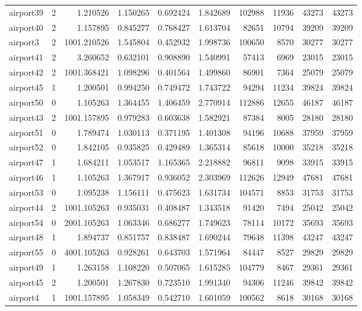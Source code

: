 \begin{longtable}{|l|r|r|r|r|r|r|r|r|r|}
airport39 & 2 & 1.210526 & 1.150265 & 0.692424 & 1.842689 & 102988 & 11936 & 43273 & 43273 \\
airport40 & 2 & 1.157895 & 0.845277 & 0.768427 & 1.613704 & 82651 & 10794 & 39209 & 39209 \\
airport3 & 2 & 1001.210526 & 1.545804 & 0.452932 & 1.998736 & 100650 & 8570 & 30277 & 30277 \\
airport41 & 2 & 3.260652 & 0.632101 & 0.908890 & 1.540991 & 57413 & 6969 & 23015 & 23015 \\
airport42 & 2 & 1001.368421 & 1.098296 & 0.401564 & 1.499860 & 86901 & 7364 & 25079 & 25079 \\
airport45 & 1 & 1.200501 & 0.994250 & 0.749472 & 1.743722 & 94294 & 11234 & 39824 & 39824 \\
airport50 & 0 & 1.105263 & 1.364455 & 1.406459 & 2.770914 & 112886 & 12655 & 46187 & 46187 \\
airport43 & 2 & 1001.157895 & 0.979283 & 0.603638 & 1.582921 & 87384 & 8005 & 28180 & 28180 \\
airport51 & 0 & 1.789474 & 1.030113 & 0.371195 & 1.401308 & 94196 & 10688 & 37959 & 37959 \\
airport52 & 0 & 1.842105 & 0.935825 & 0.429489 & 1.365314 & 85618 & 10000 & 35218 & 35218 \\
airport47 & 1 & 1.684211 & 1.053517 & 1.165365 & 2.218882 & 96811 & 9098 & 33915 & 33915 \\
airport46 & 1 & 1.105263 & 1.367917 & 0.936052 & 2.303969 & 112626 & 12949 & 47681 & 47681 \\
airport53 & 0 & 1.095238 & 1.156111 & 0.475623 & 1.631734 & 104571 & 8853 & 31753 & 31753 \\
airport44 & 2 & 1001.105263 & 0.935031 & 0.408487 & 1.343518 & 91420 & 7494 & 25042 & 25042 \\
airport54 & 0 & 2001.105263 & 1.063346 & 0.686277 & 1.749623 & 78114 & 10172 & 35693 & 35693 \\
airport48 & 1 & 1.894737 & 0.851757 & 0.838487 & 1.690244 & 79648 & 11398 & 43247 & 43247 \\
airport55 & 0 & 4001.105263 & 0.928261 & 0.643703 & 1.571964 & 84447 & 8527 & 29829 & 29829 \\
airport49 & 1 & 1.263158 & 1.108220 & 0.507065 & 1.615285 & 104779 & 8467 & 29361 & 29361 \\
airport45 & 2 & 1.200501 & 1.267830 & 0.723510 & 1.991340 & 94306 & 11246 & 39842 & 39842 \\
airport4 & 1 & 1001.157895 & 1.058349 & 0.542710 & 1.601059 & 100562 & 8618 & 30168 & 30168 \\

\end{longtable}
